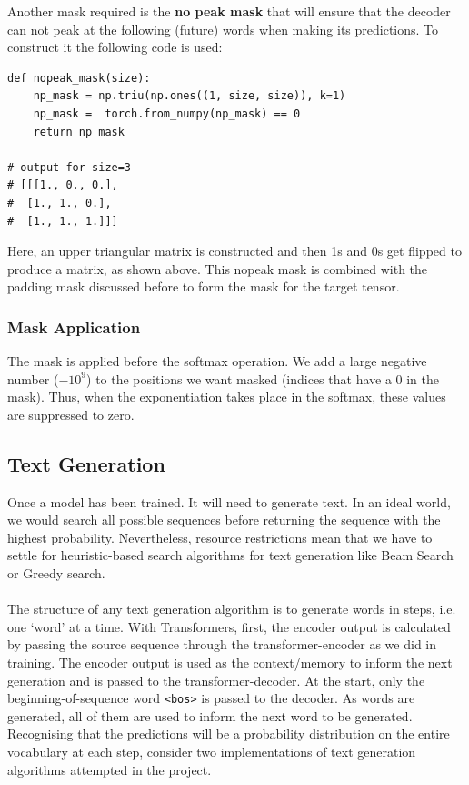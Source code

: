 \documentclass[12pt,a4paper,twoside,openright]{report}
\begin{document}
Another mask required is the \textbf{no peak mask} that will ensure that the decoder can not peak at the following (future) words when making its predictions. To construct it the following code is used:
\begin{lstlisting}[label=nopeak-mask-code,caption=No Peak Mask generator]
def nopeak_mask(size):
    np_mask = np.triu(np.ones((1, size, size)), k=1)
    np_mask =  torch.from_numpy(np_mask) == 0
    return np_mask

# output for size=3
# [[[1., 0., 0.],
#  [1., 1., 0.],
#  [1., 1., 1.]]]
\end{lstlisting}

Here, an upper triangular matrix is constructed and then 1s and 0s get flipped to produce a matrix, as shown above. This nopeak mask is combined with the padding mask discussed before to form the mask for the target tensor.

\subsubsection{Mask Application}
The mask is applied before the softmax operation. We add a large negative number ($-10^9$) to the positions we want masked (indices that have a 0 in the mask). Thus, when the exponentiation takes place in the softmax, these values are suppressed to zero.

\subsection{Text Generation}
\label{text-generation}
Once a model has been trained. It will need to generate text.
In an ideal world, we would search all possible sequences before returning the sequence with the highest probability. Nevertheless, resource restrictions mean that we have to settle for heuristic-based search algorithms for text generation like Beam Search\cite{beam-serach-paper} or Greedy search.
\\\\
The structure of any text generation algorithm is to generate words in steps, i.e. one `word' at a time. With Transformers, first, the encoder output is calculated by passing the source sequence through the transformer-encoder as we did in training. The encoder output is used as the context/memory to inform the next generation and is passed to the transformer-decoder. At the start, only the beginning-of-sequence word \lstinline{<bos>} is passed to the decoder. As words are generated, all of them are used to inform the next word to be generated. Recognising that the predictions will be a probability distribution on the entire vocabulary at each step, consider two implementations of text generation algorithms attempted in the project.
\end{document}
